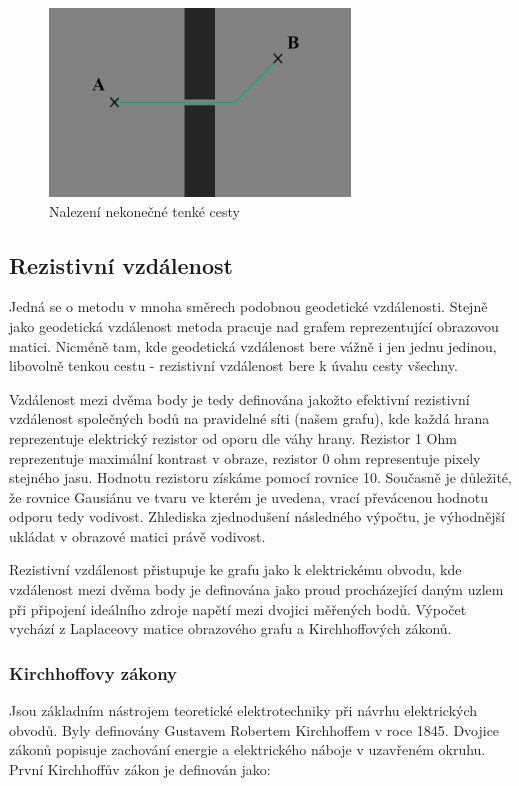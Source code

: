 \documentclass[czech, master, public, dept460, male, cpdeclaration, oneside]{diploma}
\begin{document}
\begin{figure}[H]
	\vspace*{+3.0mm}
	\centering
	\includegraphics[height=5cm]{Figures/explanatory/geodesicMetric.png}
	\caption{Nalezení nekonečné tenké cesty}
\end{figure}

\subsection{Rezistivní vzdálenost}
Jedná se o metodu v mnoha směrech podobnou geodetické vzdálenosti. Stejně jako geodetická vzdálenost metoda pracuje nad grafem reprezentující obrazovou matici. Nicméně tam, kde geodetická vzdálenost bere vážně i jen jednu jedinou, libovolně tenkou cestu - rezistivní vzdálenost bere k úvahu cesty všechny. \cite{Klein}\par
Vzdálenost mezi dvěma body je tedy definována jakožto efektivní rezistivní vzdálenost společných bodů na pravidelné síti (našem grafu), kde každá hrana reprezentuje elektrický rezistor od oporu dle váhy hrany. Rezistor 1 Ohm reprezentuje maximální kontrast v obraze, rezistor 0 ohm representuje pixely stejného jasu. Hodnotu rezistoru získáme pomocí rovnice 10. Současně je důležité, že rovnice Gausiánu ve tvaru ve kterém je uvedena, vrací převácenou hodnotu odporu tedy vodivost. Zhlediska zjednodušení následného výpočtu, je výhodnější ukládat v obrazové matici právě vodivost. \par
Rezistivní vzdálenost přistupuje ke grafu jako k elektrickému obvodu, kde vzdálenost mezi dvěma body je definována jako proud procházející daným uzlem při připojení ideálního zdroje napětí mezi dvojici měřených bodů. Výpočet vychází z Laplaceovy matice obrazového grafu a Kirchhoffových zákonů.

\subsubsection{Kirchhoffovy zákony}
Jsou základním nástrojem teoretické elektrotechniky při návrhu elektrických obvodů. Byly definovány Gustavem Robertem Kirchhoffem v roce 1845. Dvojice zákonů popisuje zachování energie a elektrického náboje v uzavřeném okruhu. První Kirchhoffův zákon je definován jako:
\end{document}
